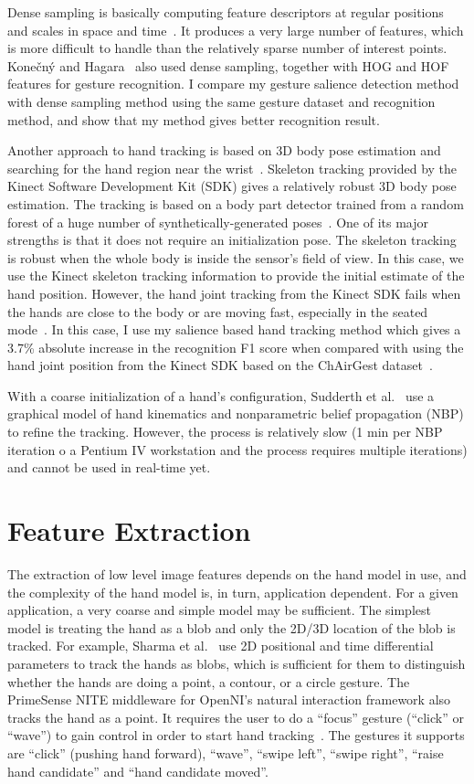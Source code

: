 Dense sampling is basically computing feature descriptors at regular positions and scales in space and time~\cite{wang-spatio-09}.
It produces a very large number of features, which is more difficult to handle than the relatively sparse number of interest points.
Kone\v{c}n\'{y} and Hagara~\cite{konecny13} also used dense sampling, together
with HOG and HOF features for gesture recognition. I compare my gesture
salience detection method with dense sampling method using the same gesture
dataset and recognition method, and show that my method gives better
recognition result.

Another approach to hand tracking is based on 3D body pose estimation and searching for the hand region near the wrist~\cite{song11}.
Skeleton tracking provided by the Kinect Software Development Kit (SDK) gives a relatively robust 3D body pose estimation. The tracking
is based on a body part detector trained from a random forest of a huge number of synthetically-generated poses~\cite{shotton13}. One of its
major strengths is that it does not require an initialization pose. The skeleton
tracking is robust when the whole body is inside the sensor's field of view. In
this case, we use the Kinect skeleton tracking information to provide the
initial estimate of the hand position. However, the hand joint tracking
from the Kinect SDK fails when the hands are close to the body or are moving
fast, especially in the seated mode~\cite{yin13}.
In this case, I use my salience based hand tracking method which
gives a 3.7\% absolute increase in the recognition F1 score when compared with
using the hand joint position from the Kinect SDK based on the ChAirGest
dataset~\cite{Ruffieux2013}.

With a coarse initialization of a hand's configuration, Sudderth et
al.~\cite{sudderth04} use a graphical model of hand kinematics and nonparametric
belief propagation (NBP) to refine the tracking. However, the process is
relatively slow (1 min per NBP iteration o a Pentium IV workstation and the
process requires multiple iterations) and cannot be used in real-time yet. 

\section{Feature Extraction}
The extraction of low level image features depends on the hand model in use, and
the complexity of the hand model is, in turn,  application dependent.
For a given application, a very coarse and simple model may be sufficient. The simplest model is treating the hand as a
blob and only the 2D/3D location of the blob is tracked. For example, Sharma et
al.~\cite{sharma00} use 2D positional and time differential parameters to track
the hands as blobs, which is sufficient for them to distinguish whether the
hands are doing a point, a contour, or a circle gesture. The PrimeSense NITE
middleware for OpenNI's natural interaction framework also tracks the hand as a
point. It requires the user to do a ``focus'' gesture (``click'' or ``wave'')
to gain control in order to start hand tracking~\cite{primesense-manual}. The
gestures it supports are ``click'' (pushing hand forward), ``wave'', ``swipe
left'', ``swipe right'', ``raise hand candidate'' and ``hand candidate moved''.

